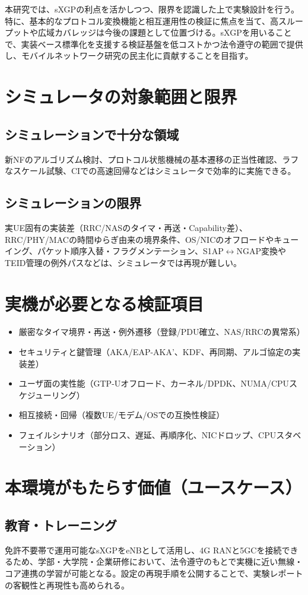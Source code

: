 本研究では、sXGPの利点を活かしつつ、限界を認識した上で実験設計を行う。特に、基本的なプロトコル変換機能と相互運用性の検証に焦点を当て、高スループットや広域カバレッジは今後の課題として位置づける。sXGPを用いることで、実装ベース標準化を支援する検証基盤を低コストかつ法令遵守の範囲で提供し、モバイルネットワーク研究の民主化に貢献することを目指す。

\section{シミュレータの対象範囲と限界}
\subsection{シミュレーションで十分な領域}
新NFのアルゴリズム検討、プロトコル状態機械の基本遷移の正当性確認、ラフなスケール試験、CIでの高速回帰などはシミュレータで効率的に実施できる。
\subsection{シミュレーションの限界}
実UE固有の実装差（RRC/NASのタイマ・再送・Capability差）、RRC/PHY/MACの時間ゆらぎ由来の境界条件、OS/NICのオフロードやキューイング、パケット順序入替・フラグメンテーション、S1AP$\leftrightarrow$NGAP変換やTEID管理の例外パスなどは、シミュレータでは再現が難しい。

\section{実機が必要となる検証項目}
\begin{itemize}
	\item 厳密なタイマ境界・再送・例外遷移（登録/PDU確立、NAS/RRCの異常系）
	\item セキュリティと鍵管理（AKA/EAP-AKA'、KDF、再同期、アルゴ協定の実装差）
	\item ユーザ面の実性能（GTP-Uオフロード、カーネル/DPDK、NUMA/CPUスケジューリング）
	\item 相互接続・回帰（複数UE/モデム/OSでの互換性検証）
	\item フェイルシナリオ（部分ロス、遅延、再順序化、NICドロップ、CPUスタベーション）
\end{itemize}

\section{本環境がもたらす価値（ユースケース）}
\label{sec:values}
\subsection{教育・トレーニング}
免許不要帯で運用可能なsXGPをeNBとして活用し、4G RANと5GCを接続できるため、学部・大学院・企業研修において、法令遵守のもとで実機に近い無線・コア連携の学習が可能となる。設定の再現手順を公開することで、実験レポートの客観性と再現性も高められる。

